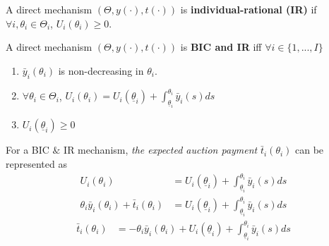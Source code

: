 \documentclass[11pt]{elegantbook_2}
\begin{document}
\begin{definition}
    A direct mechanism $\left(\Theta,y(\cdot),t(\cdot)\right)$ is \textbf{individual-rational (IR)} if $\forall i,\theta_i\in\Theta_i$, $U_i(\theta_i)\geq 0$.
\end{definition}

\begin{corollary}
    A direct mechanism $\left(\Theta,y(\cdot),t(\cdot)\right)$ is \textbf{BIC and IR} iff $\forall i\in\{1,...,I\}$
    \begin{enumerate}[(1).]
        \item $\bar{y}_i(\theta_i)$ is non-decreasing in $\theta_i$.
        \item $\forall \theta_i\in\Theta_i$, $U_i(\theta_i)=U_i(\underline{\theta}_i)+\int_{\underline{\theta}_i}^{\theta_i}\bar{y}_i(s)ds$
        \item $U_i(\underline{\theta}_i)\geq 0$
    \end{enumerate}
\end{corollary}
For a BIC $\&$ IR mechanism, \textit{the expected auction payment} $\bar{t}_i(\theta_i)$ can be represented as
\begin{equation}
    \begin{aligned}
        U_i(\theta_i)&=U_i(\underline{\theta}_i)+\int_{\underline{\theta}_i}^{\theta_i}\bar{y}_i(s)ds\\
        \theta_i \bar{y}_i(\theta_i)+\bar{t}_i(\theta_i)&=U_i(\underline{\theta}_i)+\int_{\underline{\theta}_i}^{\theta_i}\bar{y}_i(s)ds
    \end{aligned}
    \nonumber
\end{equation}
\begin{equation}
    \begin{aligned}
        \bar{t}_i(\theta_i)&=-\theta_i \bar{y}_i(\theta_i)+U_i(\underline{\theta}_i)+\int_{\underline{\theta}_i}^{\theta_i}\bar{y}_i(s)ds
    \end{aligned}
    \label{t_star}
\end{equation}
\end{document}
